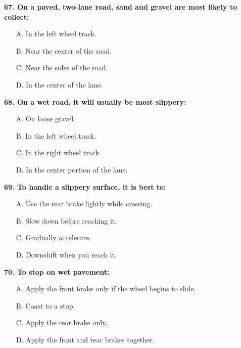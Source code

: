 \begin{minipage}{\linewidth}
\vspace{1em}\noindent\textbf{67. On a paved, two-lane road, sand and gravel are most likely to collect:}

\begin{itemize}[nosep,leftmargin=2em]
\item [A.] In the left wheel track.
\item [B.] Near the center of the road.
\item [C.] Near the sides of the road.
\item [D.] In the center of the lane.

\end{itemize}
\end{minipage}


\begin{minipage}{\linewidth}
\vspace{1em}\noindent\textbf{68. On a wet road, it will usually be most slippery:}

\begin{itemize}[nosep,leftmargin=2em]
\item [A.] On loose gravel.
\item [B.] In the left wheel track.
\item [C.] In the right wheel track.
\item [D.] In the center portion of the lane.

\end{itemize}
\end{minipage}


\begin{minipage}{\linewidth}
\vspace{1em}\noindent\textbf{69. To handle a slippery surface, it is best to:}

\begin{itemize}[nosep,leftmargin=2em]
\item [A.] Use the rear brake lightly while crossing.
\item [B.] Slow down before reaching it.
\item [C.] Gradually accelerate.
\item [D.] Downshift when you reach it.

\end{itemize}
\end{minipage}


\begin{minipage}{\linewidth}
\vspace{1em}\noindent\textbf{70. To stop on wet pavement:}

\begin{itemize}[nosep,leftmargin=2em]
\item [A.] Apply the front brake only if the wheel begins to slide.
\item [B.] Coast to a stop.
\item [C.] Apply the rear brake only.
\item [D.] Apply the front and rear brakes together.

\end{itemize}
\end{minipage}


